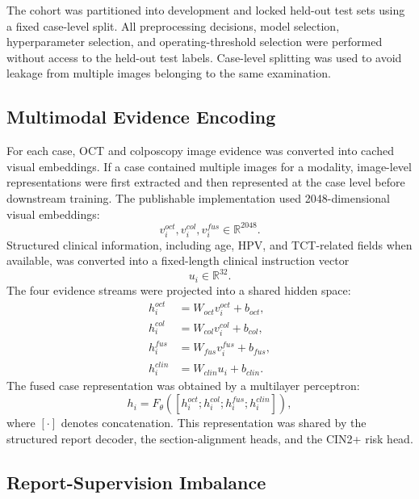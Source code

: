 The cohort was partitioned into development and locked held-out test sets using a fixed case-level split. All preprocessing decisions, model selection, hyperparameter selection, and operating-threshold selection were performed without access to the held-out test labels. Case-level splitting was used to avoid leakage from multiple images belonging to the same examination.

\subsection{Multimodal Evidence Encoding}
\label{subsec:methods_encoding}

For each case, OCT and colposcopy image evidence was converted into cached visual embeddings. If a case contained multiple images for a modality, image-level representations were first extracted and then represented at the case level before downstream training. The publishable implementation used 2048-dimensional visual embeddings:
\begin{equation}
v_i^{oct},v_i^{col},v_i^{fus}\in\mathbb{R}^{2048}.
\end{equation}
Structured clinical information, including age, HPV, and TCT-related fields when available, was converted into a fixed-length clinical instruction vector
\begin{equation}
u_i\in\mathbb{R}^{32}.
\end{equation}
The four evidence streams were projected into a shared hidden space:
\begin{align}
h_i^{oct} &= W_{oct}v_i^{oct}+b_{oct},\\
h_i^{col} &= W_{col}v_i^{col}+b_{col},\\
h_i^{fus} &= W_{fus}v_i^{fus}+b_{fus},\\
h_i^{clin} &= W_{clin}u_i+b_{clin}.
\end{align}
The fused case representation was obtained by a multilayer perceptron:
\begin{equation}
h_i = F_{\theta}\left([h_i^{oct};h_i^{col};h_i^{fus};h_i^{clin}]\right),
\end{equation}
where \([\cdot]\) denotes concatenation. This representation was shared by the structured report decoder, the section-alignment heads, and the CIN2+ risk head.

\subsection{Report-Supervision Imbalance}
\label{subsec:methods_report_imbalance}

